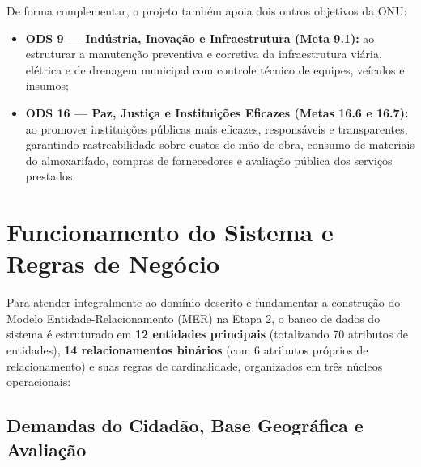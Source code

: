 \documentclass[12pt,a4paper]{article}
\begin{document}
De forma complementar, o projeto também apoia dois outros objetivos da ONU:
\begin{itemize}
  \item \textbf{ODS 9 --- Indústria, Inovação e Infraestrutura (Meta 9.1):} ao estruturar a manutenção preventiva e corretiva da infraestrutura viária, elétrica e de drenagem municipal com controle técnico de equipes, veículos e insumos;
  \item \textbf{ODS 16 --- Paz, Justiça e Instituições Eficazes (Metas 16.6 e 16.7):} ao promover instituições públicas mais eficazes, responsáveis e transparentes, garantindo rastreabilidade sobre custos de mão de obra, consumo de materiais do almoxarifado, compras de fornecedores e avaliação pública dos serviços prestados.
\end{itemize}

\section{Funcionamento do Sistema e Regras de Negócio}

Para atender integralmente ao domínio descrito e fundamentar a construção do Modelo Entidade-Relacionamento (MER) na Etapa 2, o banco de dados do sistema é estruturado em \textbf{12 entidades principais} (totalizando 70 atributos de entidades), \textbf{14 relacionamentos binários} (com 6 atributos próprios de relacionamento) e suas regras de cardinalidade, organizados em três núcleos operacionais:

\subsection{Demandas do Cidadão, Base Geográfica e Avaliação}
\end{document}
